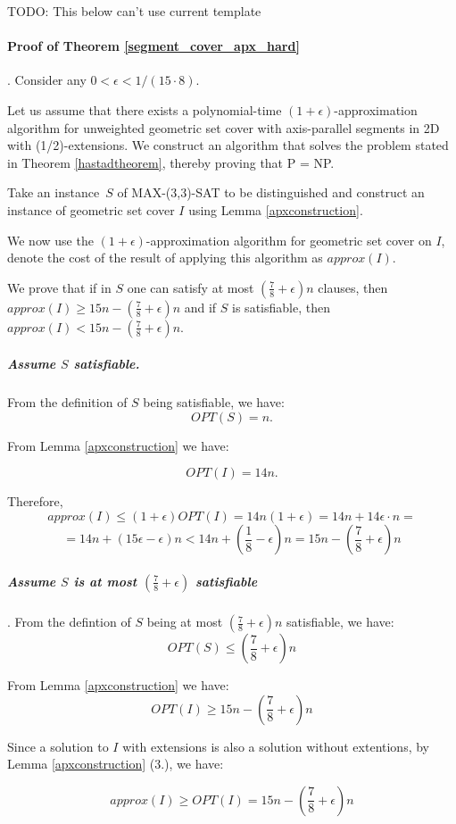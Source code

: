 TODO: This below can't use current template

\paragraph{Proof of Theorem \ref{segment_cover_apx_hard}}.
Consider any $0 < \epsilon < 1/(15 \cdot 8)$.

Let us assume that there exists a polynomial-time
$(1+\epsilon)$-approximation algorithm
for unweighted geometric set cover with axis-parallel segments in 2D
with (1/2)-extensions.
We construct an algorithm that solves the problem stated in 
Theorem \ref{hastadtheorem}, thereby proving that P = NP.

Take an instance~$S$ of MAX-(3,3)-SAT to be distinguished
and construct an instance of geometric set cover $I$
using Lemma \ref{apxconstruction}.

We now use the $(1+\epsilon)$-approximation algorithm
for geometric set cover on $I$,
denote the cost of the result of applying this algorithm as $approx(I)$.

We prove that 
if in $S$
one can satisfy at most $(\frac{7}{8}+\epsilon)n$ clauses,
then $approx(I) \ge 15n - (\frac{7}{8} + \epsilon)n$
and if $S$ is
satisfiable, then $approx(I) < 15n - (\frac{7}{8} + \epsilon)n$.

\subparagraph{Assume $S$ satisfiable.}
From the definition of $S$ being satisfiable, we have:
$$OPT(S) = n.$$

From Lemma \ref{apxconstruction} we have:

$$OPT(I) = 14n.$$

Therefore,
$$approx(I) \le (1+\epsilon)OPT(I) = 14n(1+\epsilon)
	= 14n + 14\epsilon\cdot n =$$ 
	$$= 14n + (15\epsilon - \epsilon)n < 
  14n + \left(\frac{1}{8} - \epsilon\right)n 
= 15n - \left(\frac{7}{8} + \epsilon\right)n$$

\subparagraph{Assume $S$ is at most
$\left(\frac{7}{8} + \epsilon\right)$ satisfiable}.
From the defintion of $S$ being at most 
$\left(\frac{7}{8} + \epsilon\right)n$ satisfiable, we have:
$$OPT(S) \le \left(\frac{7}{8} + \epsilon\right)n$$

From Lemma \ref{apxconstruction} we have:
$$OPT(I) \ge 15n - \left(\frac{7}{8} + \epsilon\right)n$$

Since a solution to $I$ with extensions is
also a solution without extentions, by 
Lemma \ref{apxconstruction} (3.), we have:

$$approx(I) \ge OPT(I) = 15n - \left(\frac{7}{8} + \epsilon\right)n$$


